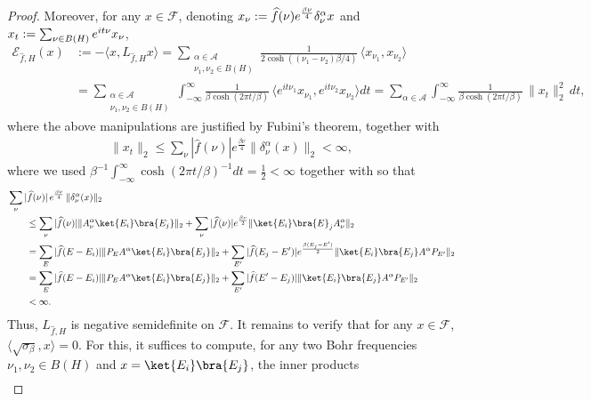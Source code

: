 \documentclass[11pt]{amsart}
\newcommand{\1}{\mathbbm{1}}
\theoremstyle{plain}
\theoremstyle{definition}
\theoremstyle{remark}
\numberwithin{equation}{section}
\begin{document}
\begin{proof}
Moreover, for any $x\in \mathscr{F}$, denoting $x_\nu:=\widehat{f}(\nu)e^{\smash{\frac{\beta\nu}{4}}}\delta_\nu^\alpha x$ and $x_t:=\sum_{\smash{\nu\in B(H)}}e^{\smash{it\nu}}x_\nu$, 
\begin{align}
\mathcal{E}_{\widehat{f},H}(x)&:=-\langle x,L_{\widehat{f},H}x\rangle=\sum_{\substack{\alpha\in\mathcal{A}\\\nu_1,\nu_2\in B(H)}}\frac{1}{2\cosh((\nu_1-\nu_2)\beta/4)}\,\langle x_{\nu_1},x_{\nu_2}\rangle\label{eq:Dirichletformdef} \\
& =\sum_{\substack{\alpha\in\mathcal{A}\\\nu_1,\nu_2\in B(H)}}\!\!\!\int_{-\infty}^\infty \frac{1}{\beta \cosh(2\pi t/\beta)}\,\langle e^{it\nu_1}x_{\nu_1},e^{it\nu_2}x_{\nu_2}\rangle dt\nonumber
 =\sum_{\alpha\in\mathcal{A}}\int_{-\infty}^\infty \frac{1}{\beta \cosh(2\pi t/\beta)}\,\|x_t\|_2^2 \,dt,\nonumber 
\end{align}
where the above manipulations are justified by Fubini's theorem, together with
\begin{align*}
\|x_t\|_2\le \sum_{\nu}|\widehat{f}(\nu)|e^{\frac{\beta\nu}{4}}\|\delta^\alpha_\nu(x)\|_2<\infty,
\end{align*}
where we used $\beta^{-1}\int_{-\infty}^\infty\cosh(2\pi t/\beta)^{-1}dt=\frac{1}{2}<\infty$ together with  so that
\begin{align}
&\sum_{\nu}|\widehat{f}(\nu)|\,e^{\frac{\beta\nu}{4}}\,\|\delta^\alpha_\nu(x)\|_2\\
&\qquad\le \sum_{\nu}|\widehat{f}(\nu)|\|A^\alpha_\nu\ket{E_i}\bra{E_j}\|_2+\sum_{\nu}|\widehat{f}(\nu)|e^{\frac{\beta\nu}{2}}\|\ket{E_i}\bra{E}_jA^\alpha_\nu\|_2\nonumber\\
&\qquad= \sum_{E}|\widehat{f}(E-E_i)|\|P_EA^\alpha \ket{E_i}\bra{E_j}\|_2+\sum_{E'}|\widehat{f}(E_j-E')|e^{\frac{\beta(E_j-E')}{2}}\|\ket{E_i}\bra{E_j}A^\alpha P_{E'}\|_2\nonumber\nonumber\\
&\qquad= \sum_{E}|\widehat{f}(E-E_i)|\|P_EA^\alpha \ket{E_i}\bra{E_j}\|_2+\sum_{E'}|\widehat{f}(E'-E_j)|\|\ket{E_i}\bra{E_j}A^\alpha P_{E'}\|_2\nonumber\nonumber\\
&\qquad<\infty.\label{eq.deltaEEbraket}
\end{align}
Thus, $L_{\widehat{f},H}$ is negative semidefinite on $\mathscr{F}$. It remains to verify that for any $x\in \mathscr{F}$, $\langle \sqrt{\sigma_\beta},x\rangle=0$. For this, it suffices to compute, for any two Bohr frequencies $\nu_1,\nu_2\in B(H)$ and $x=\ket{E_i}\bra{E_j}$, the inner products
\begin{align*}

\end{align*}
\end{proof}
\end{document}
